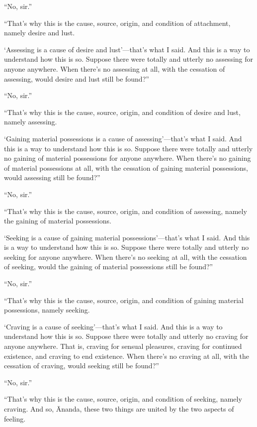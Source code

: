 \documentclass[12pt,openany]{book}%
\begin{document}
“No, sir.” 

“That’s why this is the cause, source, origin, and condition of attachment, namely desire and lust. 

‘Assessing is a cause of desire and lust’—that’s what I said. And this is a way to understand how this is so. Suppose there were totally and utterly no assessing for anyone anywhere. When there’s no assessing at all, with the cessation of assessing, would desire and lust still be found?” 

“No, sir.” 

“That’s why this is the cause, source, origin, and condition of desire and lust, namely assessing. 

‘Gaining material possessions is a cause of assessing’—that’s what I said. And this is a way to understand how this is so. Suppose there were totally and utterly no gaining of material possessions for anyone anywhere. When there’s no gaining of material possessions at all, with the cessation of gaining material possessions, would assessing still be found?” 

“No, sir.” 

“That’s why this is the cause, source, origin, and condition of assessing, namely the gaining of material possessions. 

‘Seeking is a cause of gaining material possessions’—that’s what I said. And this is a way to understand how this is so. Suppose there were totally and utterly no seeking for anyone anywhere. When there’s no seeking at all, with the cessation of seeking, would the gaining of material possessions still be found?” 

“No, sir.” 

“That’s why this is the cause, source, origin, and condition of gaining material possessions, namely seeking. 

‘Craving is a cause of seeking’—that’s what I said. And this is a way to understand how this is so. Suppose there were totally and utterly no craving for anyone anywhere. That is, craving for sensual pleasures, craving for continued existence, and craving to end existence. When there’s no craving at all, with the cessation of craving, would seeking still be found?” 

“No, sir.” 

“That’s why this is the cause, source, origin, and condition of seeking, namely craving. And so, Ānanda, these two things are united by the two aspects of feeling. 
\end{document}
